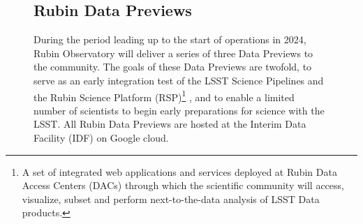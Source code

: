 \begin{figure}[!ht]
\subsection{Rubin Data Previews} \label{ssec:datapreviews}

During the period leading up to the start of operations in 2024, Rubin Observatory will deliver a series of three Data Previews to the community. 
The goals of these Data Previews are twofold, to serve as an early integration test of the LSST Science Pipelines and the Rubin Science Platform (RSP)\footnote{A set of integrated web applications and services deployed at Rubin Data Access Centers (DACs) through which the scientific community will access, visualize, subset and perform next-to-the-data analysis of LSST Data products.} \cite{lse-319}, and to enable a limited number of scientists to begin early preparations for science with the LSST.
All  Rubin Data Previews are hosted at the Interim Data Facility (IDF) on Google cloud\cite{2021arXiv211115030O}.


\end{figure}
